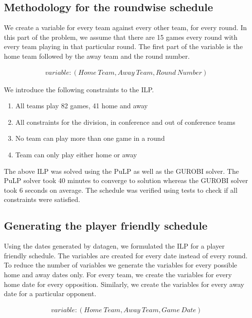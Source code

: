 \documentclass{article}
\begin{document}
	\subsection{Methodology for the roundwise schedule}
	We create a variable for every team against every other team, for every round. In this part of the problem, we assume that there are 15 games every round with every team playing in that particular round. The first part of the variable is the home team followed by the away team and the round number.

	\begin{eqnarray*}
		variable : (Home \ Team, Away \ Team, Round \ Number)
	\end{eqnarray*}

	We introduce the following constraints to the ILP.
	\begin{enumerate}
		\item All teams play 82 games, 41 home and away
		\item All constraints for the division, in conference and out of conference teams
		\item No team can play more than one game in a round
		\item Team can only play either home or away
	\end{enumerate}
	The above ILP was solved using the PuLP as well as the GUROBI solver. The PuLP solver took 40 minutes to converge to solution whereas the GUROBI solver took 6 seconds on average. The schedule was verified using tests to check if all constraints were satisfied.

	\subsection{Generating the player friendly schedule}
	Using the dates generated by datagen, we formulated the ILP for a player friendly schedule. The variables are created for every date instead of every round.  To reduce the number of variables we generate the variables for every possible home and away dates only. For every team, we create the variables for every home date for every opposition. Similarly, we create the variables for every away date for a particular opponent.

	\begin{eqnarray*}
		variable : (Home \ Team, Away \ Team, Game \ Date)
	\end{eqnarray*}
\end{document}
